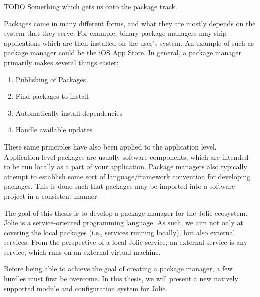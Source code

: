 TODO Something which gets us onto the package track.

Packages come in many different forms, and what they are mostly depends on the
system that they serve. For example, binary package managers may ship
applications which are then installed on the user’s system. An example of
such as package manager could be the iOS App Store. In general, a package
manager primarily makes several things easier:

\begin{enumerate}
    \item Publishing of Packages
    \item Find packages to install
    \item Automatically install dependencies
    \item Handle available updates
\end{enumerate}

These same principles have also been applied to the application level.
Application-level packages are usually software components, which are intended
to be run locally as a part of your application. Package managers also
typically attempt to establish some sort of language/framework convention for
developing packages. This is done such that packages may be imported into a
software project in a consistent manner.

The goal of this thesis is to develop a package manager for the
Jolie\autocite{montesi2010jolie,JOLA} ecosystem. Jolie is a service-oriented
programming language.
As such, we aim not only at covering the local packages (i.e., services running
        locally), but also external services. From the perspective of a local
Jolie service, an external service is any service, which runs on an external
virtual machine.

Before being able to achieve the goal of creating a package manager, a few
hurdles must first be overcome. In this thesis, we will present a new natively
supported module and configuration system for Jolie.


%

\pagebreak

